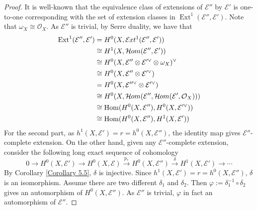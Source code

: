\documentclass{ctexart}
\renewcommand{\hom}{\operatorname{Hom}}
\newcommand{\ext}{\operatorname{Ext}}
\newcommand{\sheafhom}{\mathcal{H}\kern -.5pt om}
\newcommand{\sheafext}{\mathcal{E}\kern -.5pt xt}
\begin{document}
\begin{proof}
    It is well-known that the equivalence class of extensions of $\mathcal{E}''$ by $\mathcal{E}'$ is one-to-one corresponding with the set of extension classes in $\ext^{1}(\mathcal{E}'', \mathcal{E}')$.
    Note that $\omega_{X} \cong \mathcal{O}_{X}$.
    As $\mathcal{E}''$ is trivial, by Serre duality, we have that
    \begin{equation}
        \begin{split}
            \ext^{1}(\mathcal{E}'', \mathcal{E}') & = H^{0}(X, \sheafext^{1}(\mathcal{E}'', \mathcal{E}')) \\
            & \cong H^{1}(X, \sheafhom(\mathcal{E}'', \mathcal{E}')) \\
            & \cong H^{0}(X, \mathcal{E}'' \otimes \mathcal{E}'^{\vee} \otimes \omega_{X})^{\vee} \\
            & \cong H^{0}(X, \mathcal{E}'' \otimes \mathcal{E}'^{\vee}) \\
            & = H^{0}(X, \mathcal{E}''^{\vee} \otimes \mathcal{E}'^{\vee}) \\
            & \cong H^{0}(X, \sheafhom(\mathcal{E}'', \sheafhom(\mathcal{E}', \mathcal{O}_{X}))) \\
            & \cong \hom(H^{0}(X, \mathcal{E}''), H^{0}(X, \mathcal{E}'^{\vee})) \\
            & \cong \hom(H^{0}(X, \mathcal{E}''), H^{1}(X, \mathcal{E}'))
        \end{split}
    \end{equation}
    For the second part, as $h^{1}(X, \mathcal{E}') = r = h^{0}(X, \mathcal{E}'')$,
    the identity map gives $\mathcal{E}''$-complete extension.
    On the other hand, given any $\mathcal{E}''$-complete extension,
    consider the following long exact sequence of cohomology
    \begin{equation}
        0 \rightarrow H^{0}(X, \mathcal{E}') \rightarrow H^{0}(X, \mathcal{E}) \overset{p_{\ast}}{\rightarrow} H^{0}(X, \mathcal{E}'') \overset{\delta}{\rightarrow} H^{1}(X, \mathcal{E}') \rightarrow \cdots
    \end{equation}
    By Corollary \ref{Corollary 5.5}, $\delta$ is injective.
    Since $h^{1}(X, \mathcal{E}') = r = h^{0}(X, \mathcal{E}'')$, $\delta$ is an isomorphism.
    Assume there are two different $\delta_{1}$ and $\delta_{2}$.
    Then $\varphi := \delta_{1}^{-1} \circ \delta_{2}$ gives an automorphism of $H^{0}(X, \mathcal{E}'')$.
    As $\mathcal{E}''$ is trivial, $\varphi$ in fact an automorphism of $\mathcal{E}''$.

\end{proof}
\end{document}
